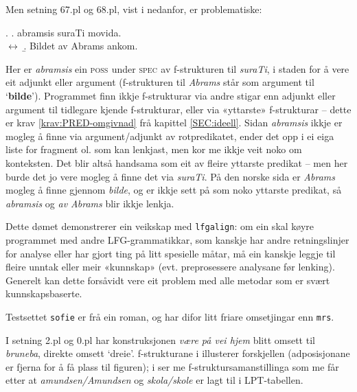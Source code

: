 \documentclass[12pt,a4paper,oneside,draft]{report}
\newcommand{\F}[2]{\textsc{#1}\ensuremath{_{#2}}}
\newcommand{\SPEC}{\F{spec}{}}
\newcommand{\POSS}{\F{poss}{}}
\newcommand{\p}[1]{`\textbf{#1}'}
\begin{document}
Men setning 67.pl og 68.pl, vist i \Next nedanfor, er problematiske:

\ex. \a. abramsis suraTi movida.\\
     $\leftrightarrow$
     \b. Bildet av Abrams ankom.

Her er \emph{abramsis} ein \POSS{} under \SPEC{} av f\hyp{}strukturen til
 \emph{suraTi}, i staden for å vere eit adjunkt eller argument
 (f\hyp{}strukturen til \emph{Abrams} står som argument til
 \p{bilde}). Programmet finn ikkje f\hyp{}strukturar via andre stigar enn
 adjunkt eller argument til tidlegare kjende f\hyp{}strukturar, eller via
 «yttarste» f\hyp{}strukturar -- dette er krav \ref{krav:PRED-omgivnad} frå
 kapittel \ref{SEC:ideell}. Sidan \emph{abramsis} ikkje er mogleg å finne
 via argument/adjunkt av rotpredikatet, ender det opp i ei eiga liste
 for fragment ol. som kan lenkjast, men kor me ikkje veit noko om
 konteksten. Det blir altså handsama som eit av fleire yttarste
 predikat -- men her burde det jo vere mogleg å finne det via
 \emph{suraTi}. På den norske sida er \emph{Abrams} mogleg å finne gjennom
 \emph{bilde}, og er ikkje sett på som noko yttarste predikat, så
 \emph{abramsis} og \emph{av Abrams} blir ikkje lenkja.

Dette dømet demonstrerer ein veikskap med \texttt{lfgalign}: om ein skal
 køyre programmet med andre LFG-grammatikkar, som kanskje har andre
 retningslinjer for analyse eller har gjort ting på litt spesielle
 måtar, må ein kanskje leggje til fleire unntak eller meir «kunnskap»
 (evt. preprosessere analysane før lenking). Generelt kan dette
 forsåvidt vere eit problem med alle metodar som er svært
 kunnskapsbaserte.


Testsettet \texttt{sofie} er frå ein roman, og har difor litt friare
 omsetjingar enn \texttt{mrs}.

I setning 2.pl og 0.pl har konstruksjonen \emph{være på vei hjem} blitt
 omsett til \emph{bruneba}, direkte omsett `dreie'. f\hyp{}strukturane i \Next
 illusterer forskjellen (adposisjonane er fjerna for å få plass til
 figuren); i \NNext ser me f\hyp{}struktursamanstillinga som me får etter
 at \emph{amundsen/Amundsen} og \emph{skola/skole} er lagt til i LPT-tabellen.
\end{document}
